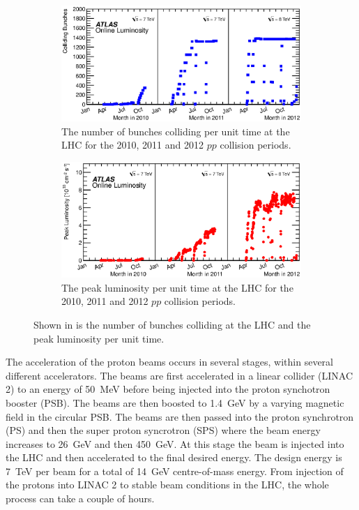 \begin{figure}[tbhp]
  \centering
  \begin{subfigure}[b]{0.95\textwidth}
    \includegraphics[width=\textwidth]{PartDetector/Plots/BunchesCollidingPerTime.eps}
    \caption{The number of bunches colliding per unit time at the LHC for the 2010, 2011 and 2012 $pp$ collision periods.} \label{fig:DetectorBunchesColliding}
  \end{subfigure}
  
  \begin{subfigure}[b]{0.95\textwidth}
    \includegraphics[width=\textwidth]{PartDetector/Plots/PeakLuminosityVsTime.eps}
    \caption{The peak luminosity per unit time at the LHC for the 2010, 2011 and 2012 $pp$ collision periods.} \label{fig:DetectorPeakLumi}
  \end{subfigure}
  \caption{Shown in  is the number of bunches colliding at the LHC and  the peak luminosity per unit time.} \label{fig:DetectorPerformance}
\end{figure}

The acceleration of the proton beams occurs in several stages, within several different accelerators. The beams are first accelerated in a linear collider (LINAC 2) to an energy of \SI{50}{\MeV} before being injected into the proton synchotron booster (PSB). The beams are then boosted to \SI{1.4}{\GeV} by a varying magnetic field in the circular PSB. The beams are then passed into the proton synchrotron (PS) and then the super proton syncrotron (SPS) where the beam energy increases to \SI{26}{\GeV} and then \SI{450}{\GeV}. At this stage the beam is injected into the LHC and then accelerated to the final desired energy. The design energy is \SI{7}{\TeV} per beam for a total of \SI{14}{\GeV} centre-of-mass energy. From injection of the protons into LINAC 2 to stable beam conditions in the LHC, the whole process can take a couple of hours.

